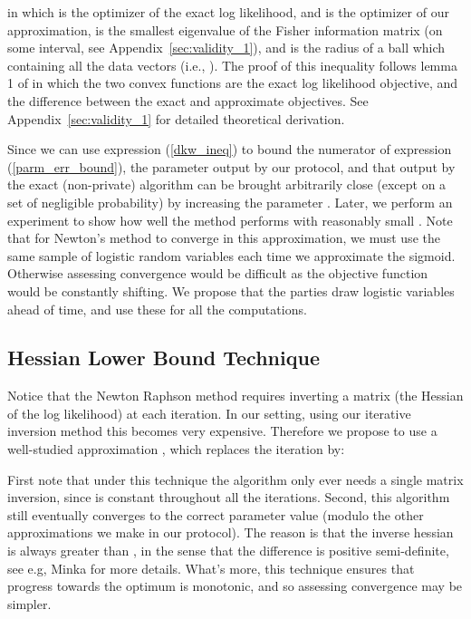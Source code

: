 \documentclass[11pt]{article}
\begin{document}
in which  is the optimizer of the exact log likelihood, and  is the optimizer of our approximation,  is the smallest eigenvalue of the Fisher information matrix  (on some interval, see Appendix~\ref{sec:validity_1}), and  is the radius of a ball which containing all the data vectors (i.e., ).  The proof of this inequality follows lemma 1 of \cite{Chaudhuri} in which the two convex functions are the exact log likelihood objective, and the difference between the exact and approximate objectives. See Appendix~\ref{sec:validity_1} for detailed theoretical derivation.

Since we can use expression (\ref{dkw_ineq})   to bound the numerator of  expression (\ref{parm_err_bound}),   the parameter output by our protocol, and that output by the exact (non-private) algorithm can be brought arbitrarily close (except on a set of negligible probability) by increasing the parameter .  Later, we perform an experiment to show how well the method performs with reasonably small .  Note that for Newton's method to converge in this approximation, we must use the same sample of  logistic random variables each time we approximate the sigmoid.  Otherwise assessing convergence would be difficult as the objective function would be constantly shifting.  We propose that the parties draw  logistic variables ahead of time, and use these for all the computations.

\subsection{Hessian Lower Bound Technique}\label{sec:hess_bound}

Notice that the Newton Raphson method requires inverting a matrix (the Hessian of the log likelihood) at each iteration.  In our setting, using our iterative inversion method this becomes very expensive.  Therefore we propose to use a well-studied approximation \cite{minka}, which replaces the iteration by:



First note that under this technique the algorithm only ever needs a single matrix inversion, since  is constant throughout all the iterations.  Second, this algorithm still eventually converges to the correct parameter value (modulo the other approximations we make in our protocol).  The reason is that the inverse hessian is always greater than , in the sense that the difference is positive semi-definite, see e.g, Minka \cite{minka} for more details.  What's more, this technique ensures that progress towards the optimum is monotonic,  and so  assessing convergence may be simpler.
\end{document}
